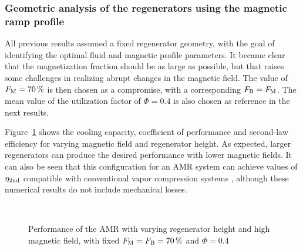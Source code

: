 \documentclass[referee]{svjour3}
\begin{document}
\subsubsection{Geometric analysis of the regenerators using the magnetic ramp profile}
\label{sec:geom-analys-regen}

All previous results assumed a fixed regenerator geometry, with the goal of identifying the optimal fluid and magnetic profile parameters. It became clear that the magnetization fraction should be as large as possible, but that raises some challenges in realizing abrupt changes in the magnetic field. The value of $F_{\mathrm{M}} = \SI{70}{\percent}$ is then chosen as a compromise, with a corresponding $F_{\mathrm{B}} = F_{\mathrm{M}}$. The mean value of the utilization factor of $\Phi = 0.4$ is also chosen as reference in the next results.

Figure~\ref{fig:qc-cop-eta-amr-height} shows the cooling capacity, coefficient of performance and second-law efficiency for varying magnetic field and regenerator height. As expected, larger regenerators can produce the desired performance with lower magnetic fields. It can also be seen that this configuration for an AMR system can achieve values of $\eta_{\mathrm{2nd}}$ compatible with conventional vapor compression systems \cite{HERMES20081341,NEGRAO20113051}, although these numerical results do not include mechanical losses.

\begin{figure}[!ht]
  \centering
{}
\,
  \caption{Performance of the AMR with varying regenerator height and high magnetic field, with fixed $F_{\mathrm{M}} = F_{\mathrm{B}} = \SI{70}{\percent}$ and $\Phi = 0.4$}
  \label{fig:qc-cop-eta-amr-height}
\end{figure}
\end{document}
